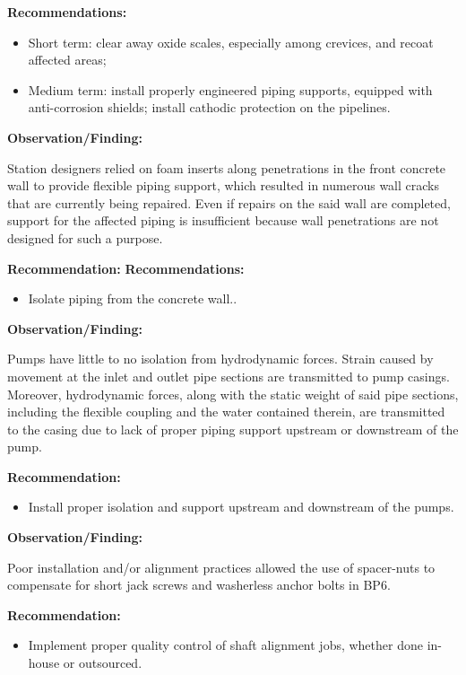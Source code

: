 \textbf{Recommendations: }
\begin{itemize}
\item Short term: clear away oxide scales, especially among crevices, and recoat affected areas; 
\item  Medium term: install properly engineered piping supports, equipped with anti-corrosion shields; install cathodic protection on the pipelines.
\end{itemize}


\textbf{Observation/Finding:}

Station designers relied on foam inserts along penetrations in the front concrete wall to provide flexible piping support, which resulted in numerous wall cracks that are currently being repaired. Even if repairs on the said wall are completed, support for the affected piping is insufficient because wall penetrations are not designed for such a purpose. 

\textbf{Recommendation: }
\textbf{Recommendations: }
\begin{itemize}
	\item Isolate piping from the concrete wall..
\end{itemize}

\textbf{Observation/Finding:}

Pumps have little to no isolation from hydrodynamic forces. Strain caused by movement at the inlet and outlet pipe sections are transmitted to pump casings. Moreover, hydrodynamic forces, along with the static weight of said pipe sections, including the flexible coupling and the water contained therein, are transmitted to the casing due to lack of proper piping support upstream or downstream of the pump.

\textbf{Recommendation:}

\begin{itemize}
	\item Install proper isolation and support upstream and downstream of the pumps.
\end{itemize}

\textbf{Observation/Finding:}

Poor installation and/or alignment practices allowed the use of spacer-nuts to compensate for short jack screws and washerless anchor bolts in BP6.

\textbf{Recommendation: }
\begin{itemize}
	\item Implement proper quality control of shaft alignment jobs, whether done in-house or outsourced.
\end{itemize}


